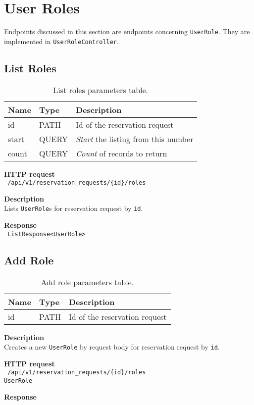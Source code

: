 \section{User Roles}
Endpoints discussed in this section are endpoints concerning \texttt{UserRole}.
They are implemented in \texttt{UserRoleController}.
\subsection{List Roles}
\begin{table}[ht!]
    \begin{tabularx}{\textwidth}{llX}
        \toprule
        Name & Type & Description \\
        \midrule
        id & PATH & Id of the reservation request \\ 
        start & QUERY & \emph{Start} the listing from this number \\  
        count & QUERY & \emph{Count} of records to return
        \end{tabularx}
    \caption{List roles parameters table.}
\end{table}
\begin{description}
    \item \textbf{HTTP request}\\
        \texttt{\text{[GET]} /api/v1/reservation\_requests/\{id\}/roles}
    \item \textbf{Description}\\
        Lists \texttt{UserRole}s for reservation request by \texttt{id}.
    \item \textbf{Response}\\
        \texttt{\text{[200 OK]} ListResponse<UserRole>}
\end{description}
\subsection{Add Role}
\begin{table}[ht!]
    \begin{tabularx}{\textwidth}{llX}
        \toprule
        Name & Type & Description \\
        \midrule
        id & PATH & Id of the reservation request \\ 
        \end{tabularx}
    \caption{Add role parameters table.}
\end{table}
\begin{description}
    \item \textbf{Description}\\
        Creates a new \texttt{UserRole} by request body for reservation request by \texttt{id}.
    \item \textbf{HTTP request}\\
        \texttt{\text{[POST]} /api/v1/reservation\_requests/\{id\}/roles}\\
        \texttt{UserRole}
    \item \textbf{Response}\\
        \texttt{\text{[200 OK]}}
\end{description}
